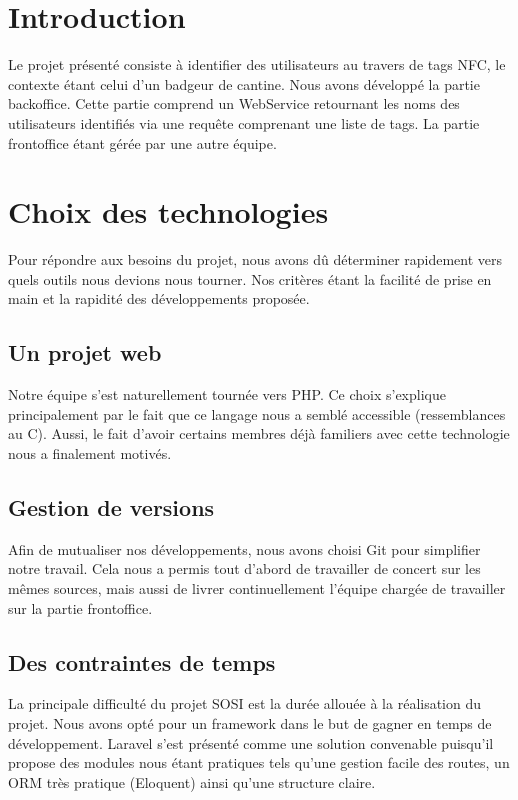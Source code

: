 \chapter*{Introduction}

Le projet présenté consiste à identifier des utilisateurs au travers de tags NFC, le
contexte étant celui d'un badgeur de cantine. Nous avons développé la partie backoffice.
Cette partie comprend un WebService retournant les noms des utilisateurs identifiés via
une requête comprenant une liste de tags. La partie frontoffice étant gérée par une autre équipe.

\chapter{Choix des technologies}

Pour répondre aux besoins du projet, nous avons dû déterminer rapidement vers quels outils
nous devions nous tourner. Nos critères étant la facilité de prise en main et la rapidité
des développements proposée.

\section{Un projet web}

Notre équipe s'est naturellement tournée vers PHP. Ce choix s'explique principalement par le fait
que ce langage nous a semblé accessible (ressemblances au C). Aussi, le fait d'avoir certains
membres déjà familiers avec cette technologie nous a finalement motivés.

\section{Gestion de versions}

Afin de mutualiser nos développements, nous avons choisi Git pour simplifier notre
travail. Cela nous a permis tout d'abord de travailler de concert sur les mêmes sources,
mais aussi de livrer continuellement l'équipe chargée de travailler sur la partie frontoffice.

\section{Des contraintes de temps}

La principale difficulté du projet SOSI est la durée allouée à la réalisation du projet.
Nous avons opté pour un framework dans le but de gagner en temps de développement. Laravel
s'est présenté comme une solution convenable puisqu'il propose des modules nous étant pratiques
tels qu'une gestion facile des routes, un ORM très pratique (Eloquent) ainsi qu'une structure
claire.
